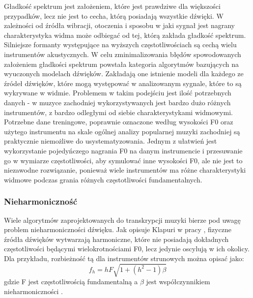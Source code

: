 \documentclass[12pt,a4paper,twoside]{mwart}
\begin{document}
Gładkość spektrum jest założeniem, które jest prawdziwe dla większości przypadków, lecz nie jest to cecha, którą posiadają wszystkie dźwięki. W zależności od źródła wibracji, otoczenia i sposobu w jaki sygnał jest nagrany charakterystyka widma może odbiegać od tej, którą zakłada gładkość spektrum. Silniejsze formanty występujące na wyższych częstotliwościach są cechą wielu instrumentów akustycznych. W celu zminimalizowania błędów spowodowanych założeniem gładkości spektrum powstała kategoria algorytmów bazujących na wyuczonych modelach dźwięków. Zakładają one istnienie modeli dla każdego ze źródeł dźwięków, które mogą występować w analizowanym sygnale, które to są wykrywane w widmie. Problemem w takim podejściu jest ilość potrzebnych danych - w muzyce zachodniej wykorzystywanych jest bardzo dużo różnych instrumentów, z bardzo odległymi od siebie charakterystykami widmowymi. Potrzebne dane treningowe, poprawnie oznaczone według wysokości F0 oraz użytego instrumentu na skale ogólnej analizy popularnej muzyki zachodniej są praktycznie niemożliwe do usystematyzowania. Jednym z ułatwień jest wykorzystanie pojedyńczego nagrania F0 na danym instrumencie i przesuwanie go w wymiarze częstotliwości, aby symulować inne wysokości F0, ale nie jest to niezawodne rozwiązanie, ponieważ wiele instrumentów ma różne charakterystyki widmowe podczas grania różnych częstotliwości fundamentalnych\cite[55-68]{Transcription:Quenneville:Thesis}.

\subsubsection{Nieharmoniczność} \label{sec:multif0:inh:model}
Wiele algorytmów zaprojektowanych do transkrypcji muzyki bierze pod uwagę problem nieharmoniczności dźwięku. Jak opisuje Klapuri w pracy \cite[806-808]{Transcription:Klapuri:MultipleFundamentalFrequencyEstimation}, fizyczne źródła dźwięków wytwarzają harmoniczne, które nie posiadają dokładnych częstotliwości będącymi wielokrotnościami F0, lecz jedynie oscylują w ich okolicy. Dla przykładu, rozbieżność tą dla instrumentów strunowych można opisać jako:
\begin{equation}\label{eq:inharmonicity:strings}
  f_h = hF \sqrt{1 + (h^2 - 1) \beta}
\end{equation}
gdzie F jest częstotliwością fundamentalną a $\beta$ jest współczynnikiem nieharmoniczności \cite[807]{Transcription:Klapuri:MultipleFundamentalFrequencyEstimation}.
\end{document}
